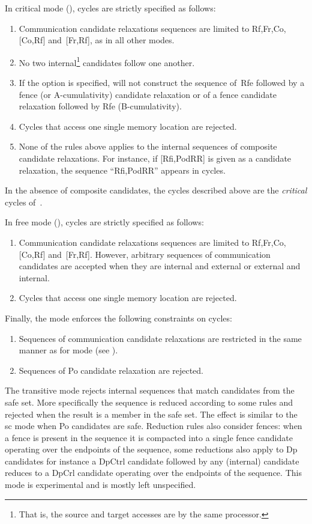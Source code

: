 \label{critical:def}%
In critical mode (),  cycles are strictly specified as
follows:
\begin{enumerate}
\item Communication candidate relaxations sequences are
limited to Rf,Fr,Co,[Co,Rf] and~[Fr,Rf], as in all other modes.
\item No two internal\footnote{That is, the source and target
accesses are by the same processor.} candidates follow one another.
\item If the option  is specified,
\diy{} will not construct
the sequence of~Rfe followed by a fence (or A-cumulativity) candidate
relaxation or of a fence candidate relaxation followed by Rfe (B-cumulativity).
\item Cycles that access one single memory location are rejected.
\item None of the rules above applies to the internal sequences of
composite candidate relaxations. For instance, if [Rfi,PodRR]
is given as a candidate relaxation, the sequence ``Rfi,PodRR'' appears
in cycles.
\end{enumerate}
In the absence of composite candidates,
the cycles described above are the \emph{critical} cycles of~\cite{ss88}.

\label{free:def}%
In free mode (), cycles are strictly specified as
follows:
\begin{enumerate}
\item Communication candidate relaxations sequences are
limited to Rf,Fr,Co,[Co,Rf] and~[Fr,Rf]. However, arbitrary sequences
of communication candidates are accepted when they are internal and external
or external and internal.
\item Cycles that access one single memory location are rejected.
\end{enumerate}

\label{uni:def}Finally, the  mode enforces the following constraints
on cycles:
\begin{enumerate}
\item Sequences of communication  candidate relaxations
are restricted in the same manner as for
 mode (see ).
\item Sequences of Po candidate relaxation are rejected.
\end{enumerate}

\label{transitive:def}
The transitive mode rejects internal sequences that match candidates from the safe set. More specifically the sequence is reduced according to some rules and rejected when the result is a member in the safe set.
The effect is similar to the sc mode when Po candidates are safe. Reduction rules also consider fences: when a fence is present in the sequence it is compacted into a single fence candidate operating over the endpoints of the sequence, some reductions also apply to Dp candidates for instance a DpCtrl candidate followed by any (internal) candidate reduces to a DpCrl candidate operating over the endpoints of the sequence.
This mode is experimental and is mostly left unspecified.


